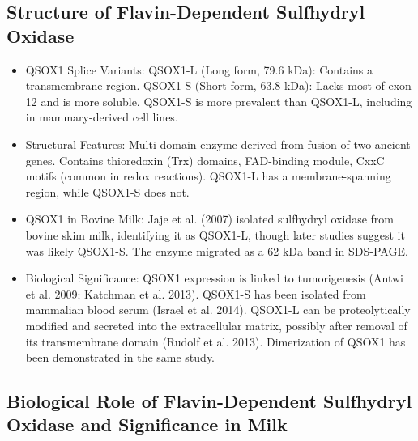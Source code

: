 \subsection*{Structure of Flavin-Dependent Sulfhydryl Oxidase}
\begin{itemize}
    \item QSOX1 Splice Variants:
    \subitem QSOX1-L (Long form, 79.6 kDa): Contains a transmembrane region.
    \subitem QSOX1-S (Short form, 63.8 kDa): Lacks most of exon 12 and is more soluble.
    \subitem QSOX1-S is more prevalent than QSOX1-L, including in mammary-derived cell lines.

    \item Structural Features:
    \subitem Multi-domain enzyme derived from fusion of two ancient genes.
    \subitem Contains thioredoxin (Trx) domains, FAD-binding module, CxxC motifs (common in redox reactions).
    \subitem QSOX1-L has a membrane-spanning region, while QSOX1-S does not.

    \item QSOX1 in Bovine Milk:
    \subitem Jaje et al. (2007) isolated sulfhydryl oxidase from bovine skim milk, identifying it as QSOX1-L, though later studies suggest it was likely QSOX1-S.
    \subitem The enzyme migrated as a 62 kDa band in SDS-PAGE.

    \item Biological Significance:
    \subitem QSOX1 expression is linked to tumorigenesis (Antwi et al. 2009; Katchman et al. 2013).
    \subitem QSOX1-S has been isolated from mammalian blood serum (Israel et al. 2014).
    \subitem QSOX1-L can be proteolytically modified and secreted into the extracellular matrix, possibly after removal of its transmembrane domain (Rudolf et al. 2013).
    \subitem Dimerization of QSOX1 has been demonstrated in the same study.
\end{itemize}

\subsection*{Biological Role of Flavin-Dependent Sulfhydryl Oxidase and Significance in Milk}

